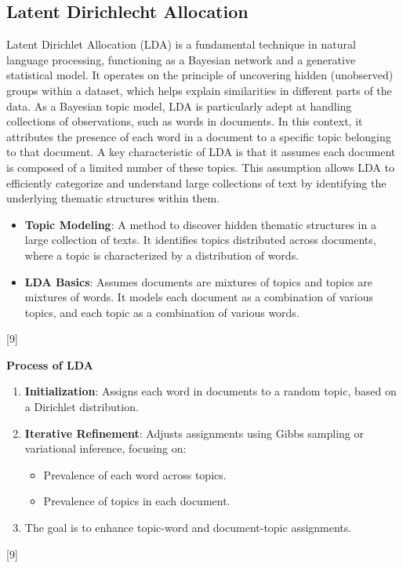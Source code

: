 \subsection*{Latent Dirichlecht Allocation}


Latent Dirichlet Allocation (LDA) is a fundamental technique in natural language processing, functioning as a Bayesian network and a generative statistical model. It operates on the principle of uncovering hidden (unobserved) groups within a dataset, which helps explain similarities in different parts of the data. As a Bayesian topic model, LDA is particularly adept at handling collections of observations, such as words in documents. In this context, it attributes the presence of each word in a document to a specific topic belonging to that document. A key characteristic of LDA is that it assumes each document is composed of a limited number of these topics. This assumption allows LDA to efficiently categorize and understand large collections of text by identifying the underlying thematic structures within them.   

\begin{itemize}
    \item \textbf{Topic Modeling}: A method to discover hidden thematic structures in a large collection of texts. It identifies topics distributed across documents, where a topic is characterized by a distribution of words.
    \item \textbf{LDA Basics}: Assumes documents are mixtures of topics and topics are mixtures of words. It models each document as a combination of various topics, and each topic as a combination of various words.
\end{itemize} [9]

\textbf{Process of LDA}
\begin{enumerate}
    \item \textbf{Initialization}: Assigns each word in documents to a random topic, based on a Dirichlet distribution.
    \item \textbf{Iterative Refinement}: Adjusts assignments using Gibbs sampling or variational inference, focusing on:
    \begin{itemize}
        \item Prevalence of each word across topics.
        \item Prevalence of topics in each document.
    \end{itemize}
    \item The goal is to enhance topic-word and document-topic assignments.
\end{enumerate} [9]


